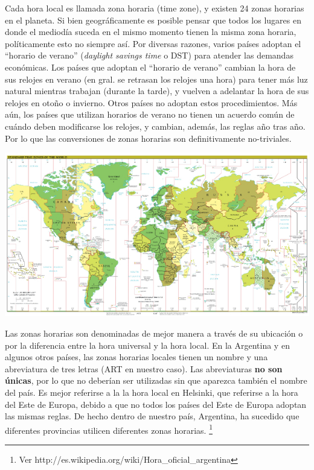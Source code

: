 \documentclass[12pt]{article}
\begin{document}
Cada hora local es llamada zona horaria (time zone), y existen 24 zonas horarias
en el planeta. Si bien geográficamente es posible pensar que todos los lugares
en donde el mediodía suceda en el mismo momento tienen la misma zona horaria,
políticamente esto no siempre así. Por diversas razones, varios países
adoptan el ``horario de verano'' (\textit{daylight savings time} o DST) para atender las demandas
económicas. Los países que adoptan el ``horario de verano'' cambian la hora
de sus relojes en verano (en gral. se retrasan los relojes una hora) para
tener más luz natural mientras trabajan (durante la tarde), y vuelven a adelantar
la hora de sus relojes en otoño o invierno. Otros países no adoptan estos procedimientos.
Más aún, los países que utilizan horarios de verano no tienen un acuerdo común de cuándo deben
modificarse los relojes, y cambian, además, las reglas año tras año. Por lo que las
conversiones de zonas horarias son definitivamente no-triviales.

\begin{center}
 \includegraphics{World_Time_Zones_Map.jpg}
\end{center}

Las zonas horarias son denominadas de mejor manera a través de su ubicación o por
la diferencia entre la hora universal y la hora local. En la Argentina y
en algunos otros países, las zonas horarias locales tienen un nombre y una abreviatura
de tres letras (ART en nuestro caso). Las abreviaturas \textbf{no son únicas}, por lo que no deberían
ser utilizadas sin que aparezca también el nombre del país. Es mejor referirse a la
la hora local en Helsinki, que referirse a la hora del Este de Europa, debido a que
no todos los países del Este de Europa adoptan las mismas reglas. De hecho dentro 
de nuestro país, Argentina,  ha sucedido que diferentes provincias utilicen diferentes
zonas horarias. \footnote{Ver http://es.wikipedia.org/wiki/Hora\_oficial\_argentina}
\end{document}
